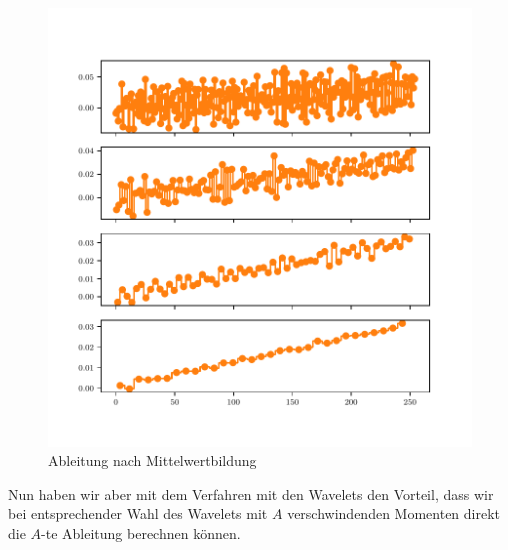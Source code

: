 \begin{refsection}
\begin{figure}
    \centering
    \includegraphics{papers/polynomials/images/polynomials_noise_moving_average.pdf}
    \caption{Ableitung nach Mittelwertbildung\label{polynomials:noise:average}}
\end{figure}

Nun haben wir aber mit dem Verfahren mit den Wavelets den Vorteil, dass wir bei
entsprechender Wahl des Wavelets mit $A$ verschwindenden Momenten direkt die
$A$-te Ableitung berechnen können.


\end{refsection}
